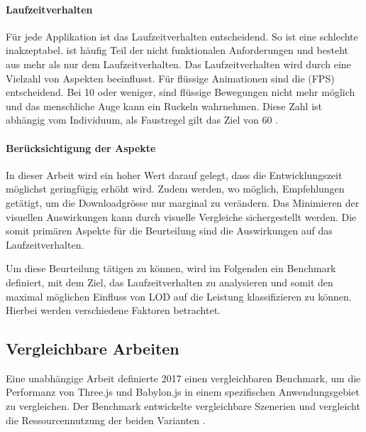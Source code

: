 \paragraph{Laufzeitverhalten}

Für jede Applikation ist das Laufzeitverhalten entscheidend. So ist eine schlechte  inakzeptabel.  ist häufig Teil der nicht funktionalen Anforderungen und besteht aus mehr als nur dem Laufzeitverhalten.
Das Laufzeitverhalten wird durch eine Vielzahl von Aspekten beeinflusst.
Für flüssige Animationen sind die  (FPS) entscheidend. Bei 10  oder weniger, sind flüssige Bewegungen nicht mehr möglich und das menschliche Auge kann ein Ruckeln wahrnehmen. Diese Zahl ist abhängig vom Individuum, als Faustregel gilt das Ziel von 60  \cite{limitsOfHumanVision}.

\paragraph{Berücksichtigung der Aspekte}
In dieser Arbeit wird ein hoher Wert darauf gelegt, dass die Entwicklungszeit möglichst geringfügig erhöht wird. Zudem werden, wo möglich, Empfehlungen getätigt, um die Downloadgrösse nur marginal zu verändern. Das Minimieren der visuellen Auswirkungen kann durch visuelle Vergleiche sichergestellt werden.
Die somit primären Aspekte für die Beurteilung sind die Auswirkungen auf das Laufzeitverhalten.

Um diese Beurteilung tätigen zu können, wird im Folgenden ein Benchmark definiert, mit dem Ziel, das Laufzeitverhalten zu analysieren und somit den maximal möglichen Einfluss von LOD auf die Leistung klassifizieren zu können. Hierbei werden verschiedene Faktoren betrachtet.

\subsection{Vergleichbare Arbeiten}
Eine unabhängige Arbeit definierte 2017 einen vergleichbaren Benchmark, um die Performanz von Three.js und Babylon.js in einem spezifischen Anwendungsgebiet zu vergleichen. Der Benchmark entwickelte vergleichbare Szenerien und vergleicht die Ressourcennutzung der beiden Varianten \cite{performanceComparisonBabylonThreejs}.

